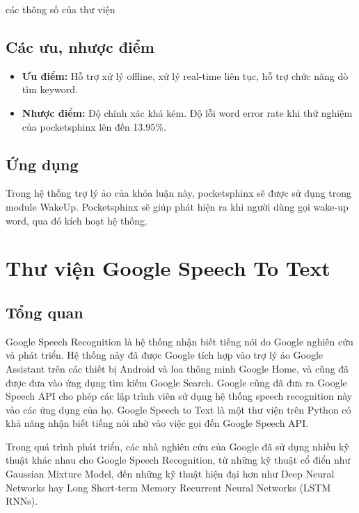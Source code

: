các thông số của thư viện

\subsection{Các ưu, nhược điểm}

\begin{itemize}
    \item \textbf{Ưu điểm:} Hỗ trợ xử lý offline, xử lý real-time liên tục, hỗ trợ chức năng dò tìm keyword.
    \item \textbf{Nhược điểm:} Độ chính xác khá kém. Độ lỗi word error rate khi thử nghiệm của pocketsphinx lên đến 13.95\%\cite{huggins2006pocketsphinx}.
\end{itemize}

\subsection{Ứng dụng}

Trong hệ thống trợ lý ảo của khóa luận này, pocketsphinx sẽ được sử dụng trong module WakeUp. Pocketsphinx sẽ giúp phát hiện ra khi người dùng gọi wake-up word, qua đó kích hoạt hệ thống.

\section{Thư viện Google Speech To Text}

\subsection{Tổng quan}

Google Speech Recognition là hệ thống nhận biết tiếng nói do Google nghiên cứu và phát triển. Hệ thống này đã được Google tích hợp vào trợ lý ảo Google Assistant trên các thiết bị Android và loa thông minh Google Home, và cũng đã được đưa vào ứng dụng tìm kiếm Google Search. Google cũng đã đưa ra Google Speech API cho phép các lập trình viên sử dụng hệ thống speech recognition này vào các ứng dụng của họ. Google Speech to Text là một thư viện trên Python có khả năng nhận biết tiếng nói nhờ vào việc gọi đến Google Speech API.

Trong quá trình phát triển, các nhà nghiên cứu của Google đã sử dụng nhiều kỹ thuật khác nhau cho Google Speech Recognition, từ những kỹ thuật cổ điển như Gaussian Mixture Model, đến những kỹ thuật hiện đại hơn như Deep Neural Networks hay Long Short-term Memory Recurrent Neural Networks (LSTM RNNs)\cite{beaufays}.

